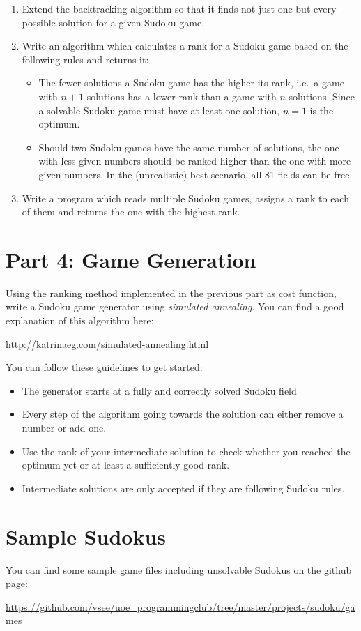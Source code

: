 \documentclass{article}
\begin{document}
    \begin{enumerate}
        \item Extend the backtracking algorithm so that it finds not just one but every
            possible solution for a given Sudoku game.
        \item Write an algorithm which calculates a rank for a Sudoku game based on the
            following rules and returns it:
            \begin{itemize}
                \item The fewer solutions a Sudoku game has the higher its rank, i.e.\ a game
                    with $n + 1$ solutions has a lower rank than a game with $n$ solutions.
                    Since a solvable Sudoku game must have at least one solution, $n=1$ is the
                    optimum.
                \item Should two Sudoku games have the same number of solutions, the one with 
                    less given numbers should be ranked higher than the one with more
                    given numbers. In the (unrealistic) best scenario, all 81 fields can be free.
            \end{itemize}
        \item Write a program which reads multiple Sudoku games, assigns a rank to each of them
            and returns the one with the highest rank.
    \end{enumerate}
    
    \section{Part 4: Game Generation}

    Using the ranking method implemented in the previous part as cost function, write a 
    Sudoku game generator using \textit{simulated annealing}. You can find a good explanation
    of this algorithm here:

    \url{http://katrinaeg.com/simulated-annealing.html}

    You can follow these guidelines to get started:
    \begin{itemize}
        \item The generator starts at a fully and correctly solved Sudoku field
        \item Every step of the algorithm going towards the solution can either remove
            a number or add one.
        \item Use the rank of your intermediate solution to check whether you reached the
            optimum yet or at least a sufficiently good rank.
        \item Intermediate solutions are only accepted if they are following Sudoku rules.
    \end{itemize}

    \section{Sample Sudokus}
    You can find some sample game files including unsolvable Sudokus on the github page:

    \url{https://github.com/vsee/uoe_programmingclub/tree/master/projects/sudoku/games}
\end{document}
